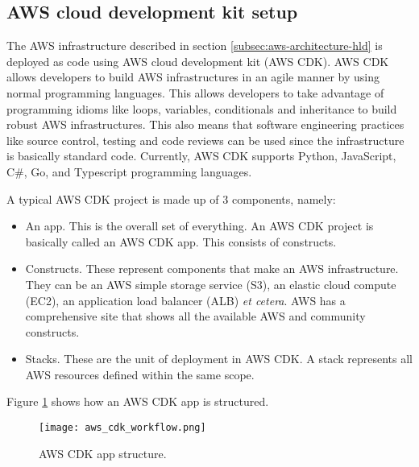 


\subsection{AWS cloud development kit setup}
\label{subsec:aws-cdk-setup}

The AWS infrastructure described in section \ref{subsec:aws-architecture-hld} is deployed as code using AWS cloud development kit (AWS CDK). AWS CDK allows developers to build AWS infrastructures in an agile manner by using normal programming languages. This allows developers to take advantage of programming idioms like loops, variables, conditionals and inheritance to build robust AWS infrastructures. This also means that software engineering practices like source control, testing and code reviews can be used since the infrastructure is basically standard code. Currently, AWS CDK supports Python, JavaScript, C\#, Go, and Typescript programming languages.

A typical AWS CDK project is made up of 3 components, namely:

\begin{itemize}
    \item An app. This is the overall set of everything. An AWS CDK project is basically called an AWS CDK app. This consists of constructs.
    \item Constructs. These represent components that make an AWS infrastructure. They can be an AWS simple storage service (S3), an elastic cloud compute (EC2), an application load balancer (ALB) \textit{et cetera}. AWS has a comprehensive site that shows all the available AWS and community constructs\cite{awsconstructhub}.
    \item Stacks. These are the unit of deployment in AWS CDK. A stack represents all AWS resources defined within the same scope.
\end{itemize}

Figure \ref{fig:aws-cdk-app-structure} shows how an AWS CDK app is structured.

\begin{figure}[H]
    \centering \texttt{[image: aws\_cdk\_workflow.png]}
    \caption{AWS CDK app structure.}
    \label{fig:aws-cdk-app-structure}
\end{figure}

